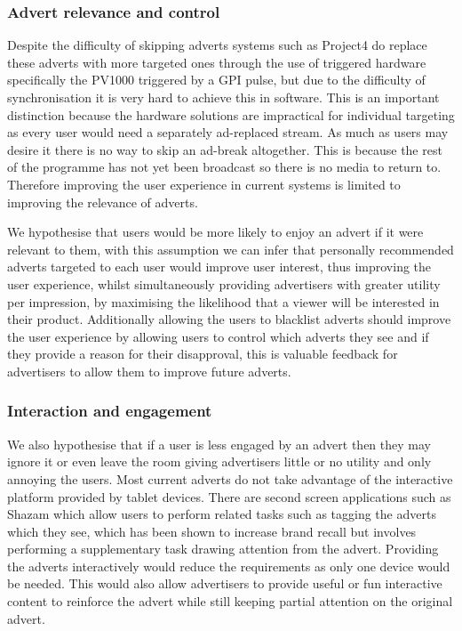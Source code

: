 \subsubsection{Advert relevance and control}
Despite the difficulty of skipping adverts systems such as Project4 do replace these adverts with more targeted ones through the use of triggered hardware specifically the PV1000 triggered by a GPI pulse, but due to the difficulty of synchronisation\cite{softwareTimeSync} it is very hard to achieve this in software. This is an important distinction because the hardware solutions are impractical for individual targeting as every user would need a separately ad-replaced stream. As much as users may desire it there is no way to skip an ad-break altogether. This is because the rest of the programme has not yet been broadcast so there is no media to return to. Therefore improving the user experience in current systems is limited to improving the relevance of adverts.

We hypothesise that users would be more likely to enjoy an advert if it were relevant to them, with this assumption we can infer that personally recommended adverts targeted to each user would improve user interest, thus improving the user experience, whilst simultaneously providing advertisers with greater utility per impression, by maximising the likelihood that a viewer will be interested in their product. Additionally allowing the users to blacklist adverts should improve the user experience by allowing users to control which adverts they see and if they provide a reason for their disapproval, this is valuable feedback for advertisers to allow them to improve future adverts.

\subsubsection{Interaction and engagement}
We also hypothesise that if a user is less engaged by an advert then they may ignore it or even leave the room giving advertisers little or no utility and only annoying the users. Most current adverts do not take advantage of the interactive platform provided by tablet devices. There are second screen applications such as Shazam\cite{shazam} which allow users to perform related tasks such as tagging the adverts which they see, which has been shown to increase brand recall but involves performing a supplementary task drawing attention from the advert. Providing the adverts interactively would reduce the requirements as only one device would be needed. This would also allow advertisers to provide useful or fun interactive content to reinforce the advert while still keeping partial attention on the original advert.

